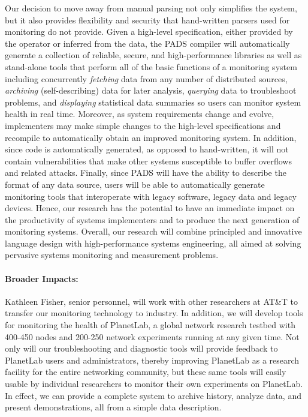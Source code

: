 Our decision to move away from manual parsing not only simplifies the
system, but it also provides flexibility and security that
hand-written parsers used for monitoring do not provide.  Given a
high-level specification, either provided by the operator or inferred
from the data, the PADS compiler will automatically generate a
collection of reliable, secure, and high-performance libraries as well
as stand-alone tools that perform all of the basic functions of a
monitoring system including concurrently {\em fetching} data from any
number of distributed sources, {\em archiving} (self-describing) data
for later analysis, {\em querying} data to troubleshoot problems, and
{\em displaying} statistical data summaries so users can monitor
system health in real time.  Moreover, as system requirements change
and evolve, implementers may make simple changes to the high-level
specifications and recompile to automatically obtain an improved
monitoring system.  In addition, since code is automatically
generated, as opposed to hand-written, it will not contain
vulnerabilities that make other systems susceptible to buffer
overflows and related attacks.  Finally, since PADS will have the
ability to describe the format of any data source, users will be able
to automatically generate monitoring tools that interoperate with
legacy software, legacy data and legacy devices.  Hence, our research
has the potential to have an immediate impact on the productivity of
systems implementers and to produce the next generation of monitoring
systems.  Overall, our research will combine principled and innovative
language design with high-performance systems engineering, all aimed
at solving pervasive systems monitoring and measurement problems.

\paragraph*{Broader Impacts:}  Kathleen Fisher, senior personnel, 
will work with other researchers at AT\&T to transfer our monitoring
technology to industry.  In addition, we will develop tools for
monitoring the health of PlanetLab, a global network research testbed
with 400-450 nodes and 200-250 network experiments running at any
given time.  Not only will our troubleshooting and diagnostic tools
will provide feedback to PlanetLab users and administrators, thereby
improving PlanetLab as a research facility for the entire networking
community, but these same tools will easily usable by individual
researchers to monitor their own experiments on PlanetLab. In effect,
we can provide a complete system to archive history, analyze data, and
present demonstrations, all from a simple data description.

